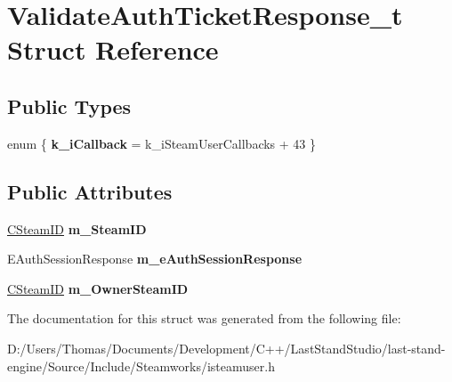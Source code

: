 \hypertarget{structValidateAuthTicketResponse__t}{}\section{Validate\+Auth\+Ticket\+Response\+\_\+t Struct Reference}
\label{structValidateAuthTicketResponse__t}
\subsection*{Public Types}
\begin{DoxyCompactItemize}
\item 
\hypertarget{structValidateAuthTicketResponse__t_a4242f0c4f1434a9ff9df3323250f209e}{}enum \{ {\bfseries k\+\_\+i\+Callback} = k\+\_\+i\+Steam\+User\+Callbacks + 43
 \}\label{structValidateAuthTicketResponse__t_a4242f0c4f1434a9ff9df3323250f209e}

\end{DoxyCompactItemize}
\subsection*{Public Attributes}
\begin{DoxyCompactItemize}
\item 
\hypertarget{structValidateAuthTicketResponse__t_a8d63ea7b8556bd1b821f52b8ea27de8a}{}\hyperlink{classCSteamID}{C\+Steam\+I\+D} {\bfseries m\+\_\+\+Steam\+I\+D}\label{structValidateAuthTicketResponse__t_a8d63ea7b8556bd1b821f52b8ea27de8a}

\item 
\hypertarget{structValidateAuthTicketResponse__t_a7b3290195fc99d5075bce745f5be3b1f}{}E\+Auth\+Session\+Response {\bfseries m\+\_\+e\+Auth\+Session\+Response}\label{structValidateAuthTicketResponse__t_a7b3290195fc99d5075bce745f5be3b1f}

\item 
\hypertarget{structValidateAuthTicketResponse__t_a50e9ea2a6962d33f9e94024eea94b0a6}{}\hyperlink{classCSteamID}{C\+Steam\+I\+D} {\bfseries m\+\_\+\+Owner\+Steam\+I\+D}\label{structValidateAuthTicketResponse__t_a50e9ea2a6962d33f9e94024eea94b0a6}

\end{DoxyCompactItemize}


The documentation for this struct was generated from the following file\+:\begin{DoxyCompactItemize}
\item 
D\+:/\+Users/\+Thomas/\+Documents/\+Development/\+C++/\+Last\+Stand\+Studio/last-\/stand-\/engine/\+Source/\+Include/\+Steamworks/isteamuser.\+h\end{DoxyCompactItemize}
